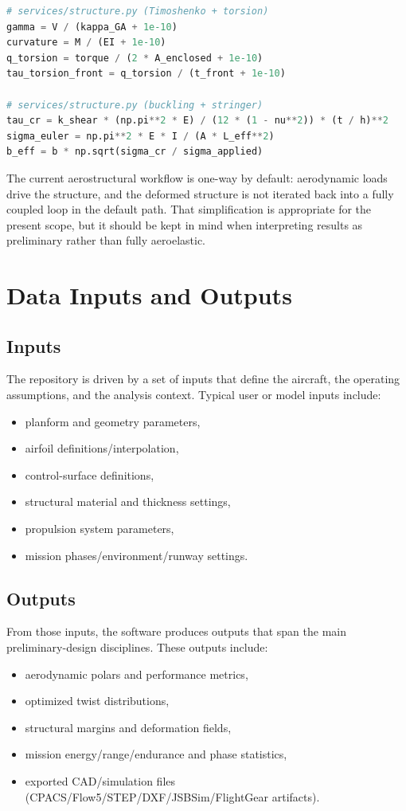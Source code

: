 \begin{lstlisting}[language=Python,caption={Key structural equations as implemented}]
# services/structure.py (Timoshenko + torsion)
gamma = V / (kappa_GA + 1e-10)
curvature = M / (EI + 1e-10)
q_torsion = torque / (2 * A_enclosed + 1e-10)
tau_torsion_front = q_torsion / (t_front + 1e-10)

# services/structure.py (buckling + stringer)
tau_cr = k_shear * (np.pi**2 * E) / (12 * (1 - nu**2)) * (t / h)**2
sigma_euler = np.pi**2 * E * I / (A * L_eff**2)
b_eff = b * np.sqrt(sigma_cr / sigma_applied)
\end{lstlisting}

The current aerostructural workflow is one-way by default: aerodynamic loads drive the structure, and the deformed structure is not iterated back into a fully coupled loop in the default path. That simplification is appropriate for the present scope, but it should be kept in mind when interpreting results as preliminary rather than fully aeroelastic.

\section{Data Inputs and Outputs}
\subsection{Inputs}
The repository is driven by a set of inputs that define the aircraft, the operating assumptions, and the analysis context. Typical user or model inputs include:
\begin{itemize}
\item planform and geometry parameters,
\item airfoil definitions/interpolation,
\item control-surface definitions,
\item structural material and thickness settings,
\item propulsion system parameters,
\item mission phases/environment/runway settings.
\end{itemize}

\subsection{Outputs}
From those inputs, the software produces outputs that span the main preliminary-design disciplines. These outputs include:
\begin{itemize}
\item aerodynamic polars and performance metrics,
\item optimized twist distributions,
\item structural margins and deformation fields,
\item mission energy/range/endurance and phase statistics,
\item exported CAD/simulation files (CPACS/Flow5/STEP/DXF/JSBSim/FlightGear artifacts).
\end{itemize}

